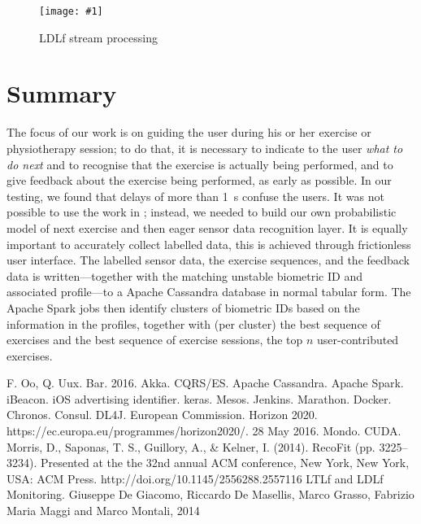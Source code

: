 \documentclass[a4paper, 10 pt, conference]{IEEEtran}
\newcommand{\fig}[3]{
  \begin{figure}[h]
    \begin{center}
        \caption{#3}
        \texttt{[image: \#1]}
        \label{fig:#2}
    \end{center}
  \end{figure}
}
\begin{document}
\fig{ri-ldlf-stream.png}{ri-ldlf-stream}{LDLf stream processing}

\section{Summary}

The focus of our work is on guiding the user during his or her exercise or physiotherapy session; to do that, it is necessary to indicate to the user \emph{what to do next} and to recognise that the exercise is actually being performed, and to give feedback about the exercise being performed, as early as possible. In our testing, we found that delays of more than \SI{1}{\second} confuse the users. It was not possible to use the work in \cite{morris:2014ir}; instead, we needed to build our own probabilistic model of next exercise and then eager sensor data recognition layer. It is equally important to accurately collect labelled data, this is achieved through frictionless user interface. The labelled sensor data, the exercise sequences, and the feedback data is written---together with the matching unstable biometric ID and associated profile---to a Apache Cassandra database in normal tabular form. The Apache Spark jobs then identify clusters of biometric IDs based on the information in the profiles, together with (per cluster) the best sequence of exercises and the best sequence of exercise sessions, the top $n$ user-contributed exercises.

\addtolength{\textheight}{-12cm}  %

\begin{thebibliography}{99}

 F. Oo, Q. Uux. Bar. 2016.
 Akka.
 CQRS/ES.
 Apache Cassandra.
 Apache Spark.
 iBeacon.
 iOS advertising identifier.
 keras.
 Mesos.
 Jenkins.
 Marathon.
 Docker.
 Chronos.
 Consul.
 DL4J.
 European Commission. Horizon 2020. https://ec.europa.eu/programmes/horizon2020/. 28 May 2016.
 Mondo.
 CUDA.
 Morris, D., Saponas, T. S., Guillory, A., \& Kelner, I. (2014). RecoFit (pp. 3225--3234). Presented at the the 32nd annual ACM conference, New York, New York, USA: ACM Press. http://doi.org/10.1145/2556288.2557116
 LTLf and LDLf Monitoring. Giuseppe De Giacomo, Riccardo De Masellis, Marco Grasso, Fabrizio Maria Maggi and Marco Montali, 2014

\end{thebibliography}
\end{document}

